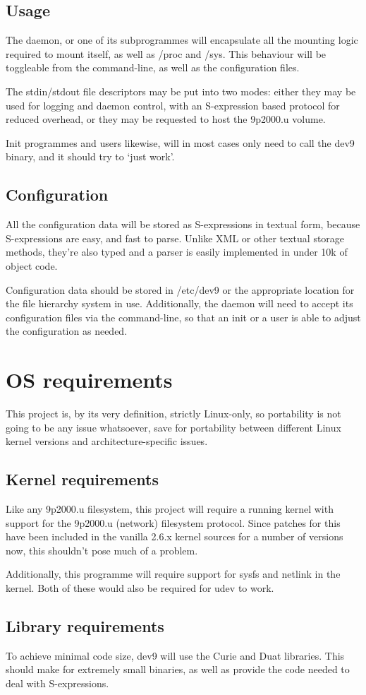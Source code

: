 \documentclass[a4paper,twoside,titlepage]{article}
\begin{document}
\subsection{Usage}
The daemon, or one of its subprogrammes will encapsulate all the mounting logic
required to mount itself, as well as /proc and /sys. This behaviour will be
toggleable from the command-line, as well as the configuration files.

The stdin/stdout file descriptors may be put into two modes: either they may be
used for logging and daemon control, with an S-expression based protocol for
reduced overhead, or they may be requested to host the 9p2000.u volume.

Init programmes and users likewise, will in most cases only need to call the
dev9 binary, and it should try to `just work'.

\subsection{Configuration}
All the configuration data will be stored as S-expressions in textual form,
because S-expressions are easy, and fast to parse. Unlike XML or other textual
storage methods, they're also typed and a parser is easily implemented in under
10k of object code.

Configuration data should be stored in /etc/dev9 or the appropriate location for
the file hierarchy system in use. Additionally, the daemon will need to accept
its configuration files via the command-line, so that an init or a user is able
to adjust the configuration as needed.

\section{OS requirements}
This project is, by its very definition, strictly Linux-only, so portability is
not going to be any issue whatsoever, save for portability between different
Linux kernel versions and architecture-specific issues.

\subsection{Kernel requirements}
Like any 9p2000.u filesystem, this project will require a running kernel with
support for the 9p2000.u (network) filesystem protocol. Since patches for this
have been included in the vanilla 2.6.x kernel sources for a number of versions
now, this shouldn't pose much of a problem.

Additionally, this programme will require support for sysfs and netlink in the
kernel. Both of these would also be required for udev to work.

\subsection{Library requirements}
To achieve minimal code size, dev9 will use the Curie and Duat libraries. This
should make for extremely small binaries, as well as provide the code needed to
deal with S-expressions.
\end{document}
